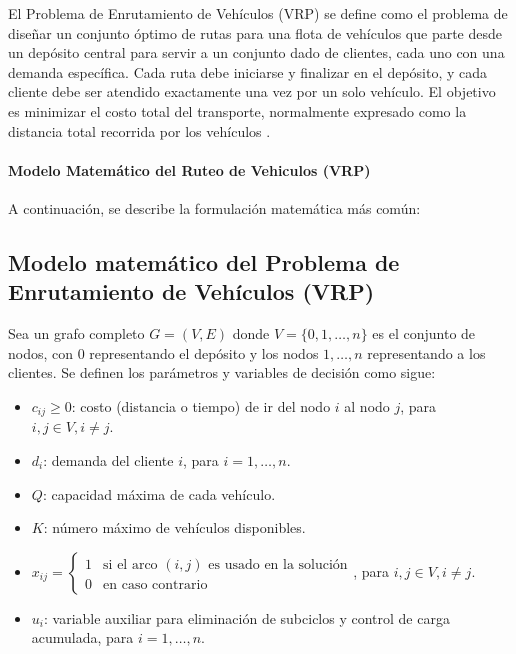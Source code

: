 \documentclass[12pt,titlepage,twoside,openright]{book}
\begin{document}
El Problema de Enrutamiento de Vehículos (VRP) se define como el problema de diseñar un conjunto óptimo de rutas para una flota de vehículos que parte desde un depósito central para servir a un conjunto dado de clientes, cada uno con una demanda específica. Cada ruta debe iniciarse y finalizar en el depósito, y cada cliente debe ser atendido exactamente una vez por un solo vehículo. El objetivo es minimizar el costo total del transporte, normalmente expresado como la distancia total recorrida por los vehículos \cite{toth2014}.

\paragraph{Modelo Matemático del Ruteo de Vehiculos (VRP)} A continuación, se describe la formulación matemática más común:

\subsection{Modelo matemático del Problema de Enrutamiento de Vehículos (VRP)}

Sea un grafo completo \( G = (V, E) \) donde \( V = \{0, 1, \ldots, n\} \) es el conjunto de nodos, con \(0\) representando el depósito y los nodos \(1, \ldots, n\) representando a los clientes. Se definen los parámetros y variables de decisión como sigue:

\begin{itemize}
	\item \( c_{ij} \geq 0 \): costo (distancia o tiempo) de ir del nodo \(i\) al nodo \(j\), para \(i,j \in V, i \neq j\).
	\item \( d_i \): demanda del cliente \(i\), para \(i=1,\ldots,n\).
	\item \( Q \): capacidad máxima de cada vehículo.
	\item \( K \): número máximo de vehículos disponibles.
	\item \( x_{ij} = \begin{cases} 1 & \text{si el arco } (i,j) \text{ es usado en la solución}\\ 0 & \text{en caso contrario} \end{cases} \), para \(i,j \in V, i \neq j\).
	\item \( u_i \): variable auxiliar para eliminación de subciclos y control de carga acumulada, para \(i=1,\ldots,n\).
\end{itemize}

\medskip
\end{document}

